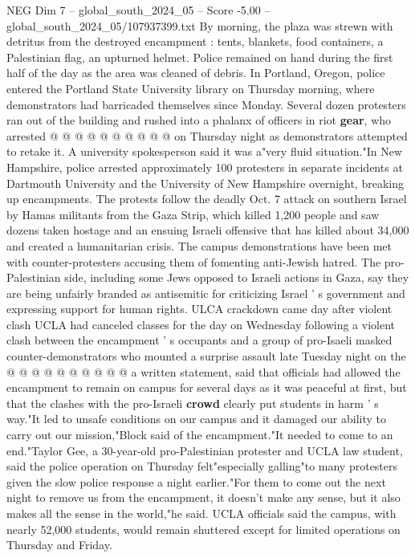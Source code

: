 \begin{textsample}{NEG Dim 7 – global\_south\_2024\_05 – Score -5.00 – global\_south\_2024\_05/107937399.txt}
By morning, the plaza was strewn with detritus from the destroyed encampment : tents, blankets, food containers, a Palestinian flag, an upturned helmet.
Police remained on hand during the first half of the day as the area was cleaned of debris.
In Portland, Oregon, police entered the Portland State University library on Thursday morning, where demonstrators had barricaded themselves since Monday.
Several dozen protesters ran out of the building and rushed into a phalanx of officers in riot \textbf{gear}, who arrested @ @ @ @ @ @ @ @ @ @ on Thursday night as demonstrators attempted to retake it.
A university spokesperson said it was a"very fluid situation."In New Hampshire, police arrested approximately 100 protesters in separate incidents at Dartmouth University and the University of New Hampshire overnight, breaking up encampments.
The protests follow the deadly Oct. 7 attack on southern Israel by Hamas militants from the Gaza Strip, which killed 1,200 people and saw dozens taken hostage and an ensuing Israeli offensive that has killed about 34,000 and created a humanitarian crisis.
The campus demonstrations have been met with counter-protesters accusing them of fomenting anti-Jewish hatred.
The pro-Palestinian side, including some Jews opposed to Israeli actions in Gaza, say they are being unfairly branded as antisemitic for criticizing Israel ' s government and expressing support for human rights.
ULCA crackdown came day after violent clash UCLA had canceled classes for the day on Wednesday following a violent clash between the encampment ' s occupants and a group of pro-Isaeli masked counter-demonstrators who mounted a surprise assault late Tuesday night on the @ @ @ @ @ @ @ @ @ @ a written statement, said that officials had allowed the encampment to remain on campus for several days as it was peaceful at first, but that the clashes with the pro-Israeli \textbf{crowd} clearly put students in harm ' s way."It led to unsafe conditions on our campus and it damaged our ability to carry out our mission,"Block said of the encampment."It needed to come to an end."Taylor Gee, a 30-year-old pro-Palestinian protester and UCLA law student, said the police operation on Thursday felt"especially galling"to many protesters given the slow police response a night earlier."For them to come out the next night to remove us from the encampment, it doesn't make any sense, but it also makes all the sense in the world,"he said.
UCLA officials said the campus, with nearly 52,000 students, would remain shuttered except for limited operations on Thursday and Friday.

\end{textsample}
